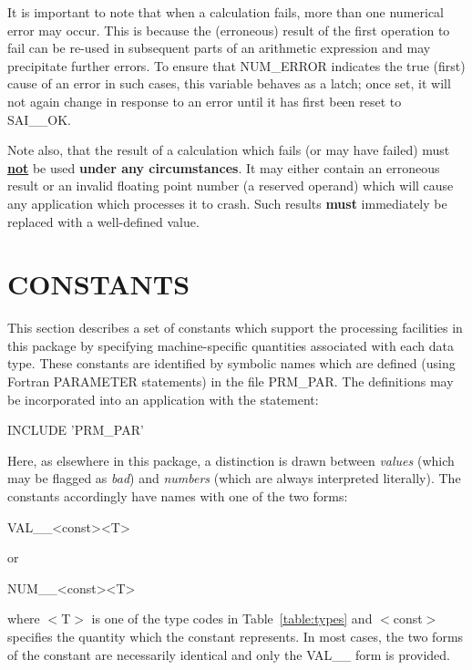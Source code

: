 \documentclass[11pt,nolof]{starlink}
\providecommand{\name}[1]{#1}
\begin{document}
It is important to note that when a calculation fails, more than
one numerical error may occur.
This is because the (erroneous) result of the first operation to fail can be
re-used in subsequent parts of an arithmetic expression and may precipitate
further errors.
To ensure that \name{NUM\_ERROR} indicates the true (first) cause of an error
in such cases, this variable behaves as a latch; once set, it will not again
change in response to an error until it has first been reset to
\name{SAI\_\_OK}.

Note also, that the result of a calculation which fails (or may have
failed) must \textbf{\underline{not}} be used \textbf{under any circumstances}.
It may either contain an erroneous result or an invalid floating point
number (a reserved operand) which will cause any application which processes
it to crash.
Such results \textbf{must} immediately be replaced with a well-defined value.

\section{CONSTANTS}

\label{section:constants}

This section describes a set of constants which support the processing
facilities in this package by specifying machine-specific quantities
associated with each data type.
These constants are identified by symbolic names which are defined (using
Fortran \name{PARAMETER} statements) in the file \name{PRM\_PAR}.
The definitions may be incorporated into an application with the statement:

\begin{terminalv}
INCLUDE 'PRM_PAR'
\end{terminalv}

Here, as elsewhere in this package, a distinction is drawn between \emph{values} (which may be flagged as \emph{bad}) and \emph{numbers} (which are
always interpreted literally).
The constants accordingly have names with one of the two forms:

\begin{terminalv}
VAL__<const><T>
\end{terminalv}
or
\begin{terminalv}
NUM__<const><T>
\end{terminalv}

where \name{$<$T$>$} is one of the type codes in Table~\ref{table:types} and
\name{$<$const$>$} specifies the quantity which the constant represents.
In most cases, the two forms of the constant are necessarily identical and
only the \name{VAL\_\_} form is provided.
\end{document}
